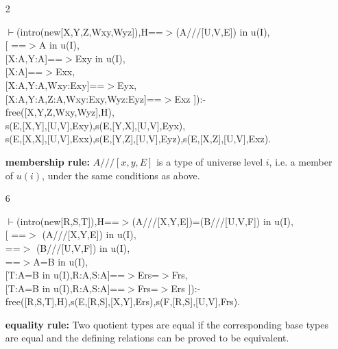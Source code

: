 \documentclass[11pt]{report}
\begin{document}
\begin{enumerate}
 \item[2]
\begin{sf}\begin{tabbing}
$\vdash$(intro(new[X,Y,Z,Wxy,Wyz]),H==$>$(A///[U,V,E]) in u(I),\\[-0.15ex]
\hspace{2em}[ ==$>$A in u(I), \\[-0.15ex]
\hspace{3em}[X:A,Y:A]==$>$Exy in u(I),\\[-0.15ex]
\hspace{3em}[X:A]==$>$Exx, \\[-0.15ex]
\hspace{3em}[X:A,Y:A,Wxy:Exy]==$>$Eyx, \\[-0.15ex]
\hspace{3em}[X:A,Y:A,Z:A,Wxy:Exy,Wyz:Eyz]==$>$Exz ]):-\\[-0.15ex]
\hspace{2em}free([X,Y,Z,Wxy,Wyz],H),\\[-0.15ex]
\hspace{2em}s(E,[X,Y],[U,V],Exy),s(E,[Y,X],[U,V],Eyx),\\[-0.15ex]
\hspace{2em}s(E,[X,X],[U,V],Exx),s(E,[Y,Z],[U,V],Eyz),s(E,[X,Z],[U,V],Exz).
\end{tabbing}\end{sf}

 {\bf membership rule:}
 $A///[x,y,E]$ is a type of universe level $i$,
 i.e. a member of $u(i)$, under the same conditions as above.
  
 \item[6]
\begin{sf}\begin{tabbing}
$\vdash$(intro(new[R,S,T]),H==$>$(A///[X,Y,E])=(B///[U,V,F]) in u(I),\\[-0.15ex]
\hspace{2em}[ ==$>$ (A///[X,Y,E]) in u(I), \\[-0.15ex]
\hspace{3em}==$>$ (B///[U,V,F]) in u(I), \\[-0.15ex]
\hspace{3em}==$>$A=B in u(I),\\[-0.15ex]
\hspace{3em}[T:A=B in u(I),R:A,S:A]==$>$Ers=$>$Frs,\\[-0.15ex]
\hspace{3em}[T:A=B in u(I),R:A,S:A]==$>$Frs=$>$Ers ]):-\\[-0.15ex]
\hspace{2em}free([R,S,T],H),s(E,[R,S],[X,Y],Ers),s(F,[R,S],[U,V],Frs).
\end{tabbing}\end{sf}

 {\bf equality rule:}
 Two quotient types are equal if the corresponding base types
 are equal and the defining relations can be proved to be equivalent.
 \end{enumerate}
  
\end{document}
